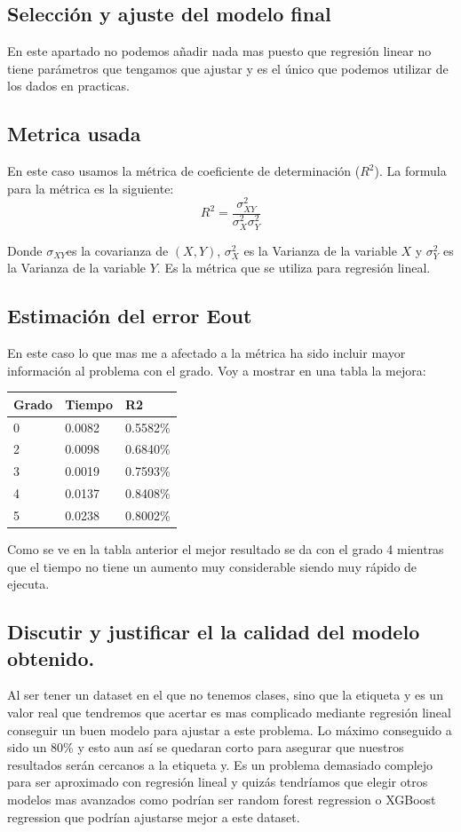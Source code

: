 \documentclass[titlepage]{article}
\begin{document}
\subsection{Selección y ajuste del modelo final}
En este apartado no podemos añadir nada mas puesto que regresión linear no tiene parámetros que tengamos que ajustar y es el único que podemos utilizar de los dados en practicas.

\subsection{Metrica usada}
En este caso usamos la métrica de coeficiente de determinación ($R^2$). 
La formula para la métrica es la siguiente:
$$
R^{2}=\frac{\sigma_{X Y}^{2}}{\sigma_{X}^{2} \sigma_{Y}^{2}}
$$

Donde $\sigma_{X Y}$es la covarianza de $(X, Y)$, $\sigma_{X}^{2}$ es la Varianza de la variable $X$ y $\sigma_{Y}^{2}$ es la Varianza de la variable $Y$. Es la métrica que se utiliza para regresión lineal.

\subsection{Estimación del error Eout}
En este caso lo que mas me a afectado a la métrica ha sido incluir mayor información al problema con el grado. Voy a mostrar en una tabla la mejora:
\begin{table}[H]
	\begin{center}
		\begin{tabular}{|l|l|l|}
			\hline
			Grado & Tiempo & R2\\
			\hline
			0 &  0.0082 & 0.5582\%\\ 
			\hline
			2 &0.0098 & 0.6840\%\\  
			\hline
			3  & 0.0019 & 0.7593\%\\  
			\hline
			4  & 0.0137 & 0.8408\%\\  
			\hline
			5  & 0.0238 & 0.8002\%\\  
			\hline
		\end{tabular}
	\end{center}
Como se ve en la tabla anterior el mejor resultado se da con el grado 4 mientras que el tiempo no tiene un aumento muy considerable siendo muy rápido de ejecuta.
\subsection{Discutir y justificar el la calidad del modelo obtenido.}
Al ser tener un dataset en el que no tenemos clases, sino que la etiqueta y es un valor real que tendremos que acertar es mas complicado mediante regresión lineal conseguir un buen modelo para ajustar a este problema. 
Lo máximo conseguido a sido un 80\% y esto aun así se quedaran corto para asegurar que nuestros resultados serán cercanos a la etiqueta y. Es un problema demasiado complejo para ser aproximado con regresión lineal y quizás tendríamos que elegir otros modelos mas avanzados como podrían ser random forest regression o XGBoost regression que podrían ajustarse mejor a este dataset.
\end{table}
\end{document}

